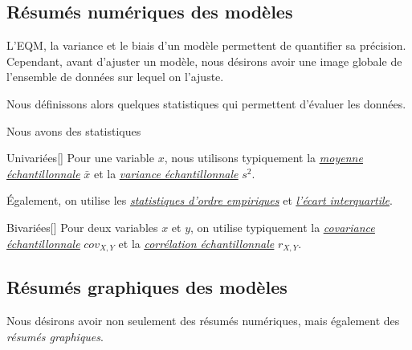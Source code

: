 \documentclass[french]{article}
\begin{document}
\begin{multicols*}{2}
\columnbreak
\subsection{Résumés numériques des modèles}
\begin{rappel_enhanced}[Contexte]
L'EQM, la variance et le biais d'un modèle permettent de quantifier sa précision. Cependant, avant d'ajuster un modèle, nous désirons avoir une image globale de l'ensemble de données sur lequel on l'ajuste. 

\bigskip

Nous définissons alors quelques statistiques qui permettent d'évaluer les données.
\end{rappel_enhanced}


Nous avons des statistiques

\begin{definitionGENERAL}{Univariées}[]
Pour une variable $x$, nous utilisons typiquement la \textit{\color{bleudefrance}\underline{\hyperlink{sampleMean}{\color{bleudefrance} moyenne échantillonnale}}} $\bar{x}$ et la \textit{\color{bleudefrance}\underline{\hyperlink{sampleVariance}{\color{bleudefrance}variance échantillonnale}}} $s^{2}$.

\bigskip

Également, on utilise les \textit{\color{bleudefrance}\underline{\hyperref[subsec:percMatching]{\color{bleudefrance} statistiques d'ordre empiriques}}} et \textit{\color{bleudefrance}\underline{\hyperlink{IQR}{\color{bleudefrance} l'écart interquartile}}}.
\end{definitionGENERAL}

\begin{definitionGENERAL}{Bivariées}[]
Pour deux variables $x$ et $y$, on utilise typiquement la \textit{\color{bleudefrance}\underline{\hyperlink{sampleCovariance}{\color{bleudefrance} covariance échantillonnale}}} $cov_{X, Y}$ et la \textit{\color{bleudefrance}\underline{\hyperlink{sampleCorrelation}{\color{bleudefrance} corrélation échantillonnale}}} $r_{X, Y}$.
\end{definitionGENERAL}



\columnbreak
\subsection{Résumés graphiques des modèles}
\begin{rappel_enhanced}[Contexte]
Nous désirons avoir non seulement des résumés numériques, mais également des \textit{résumés graphiques}.
\end{rappel_enhanced}



\end{multicols*}
\end{document}

